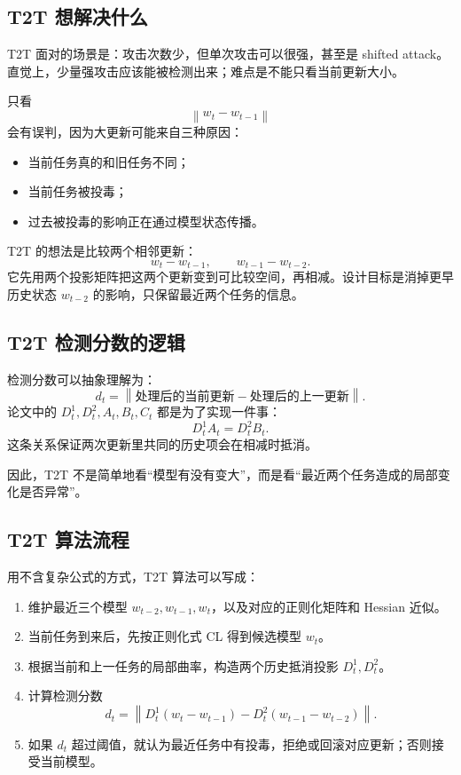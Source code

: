 \documentclass[UTF8,fontset=none,11pt]{ctexart}
\newcommand{\norm}[1]{\left\lVert #1\right\rVert}
\begin{document}
\subsection{T2T 想解决什么}

T2T 面对的场景是：攻击次数少，但单次攻击可以很强，甚至是 shifted attack。直觉上，少量强攻击应该能被检测出来；难点是不能只看当前更新大小。

只看
\[
  \norm{w_t-w_{t-1}}
\]
会有误判，因为大更新可能来自三种原因：
\begin{itemize}
  \item 当前任务真的和旧任务不同；
  \item 当前任务被投毒；
  \item 过去被投毒的影响正在通过模型状态传播。
\end{itemize}

T2T 的想法是比较两个相邻更新：
\[
  w_t-w_{t-1},
  \qquad
  w_{t-1}-w_{t-2}.
\]
它先用两个投影矩阵把这两个更新变到可比较空间，再相减。设计目标是消掉更早历史状态 \(w_{t-2}\) 的影响，只保留最近两个任务的信息。

\subsection{T2T 检测分数的逻辑}

检测分数可以抽象理解为：
\[
  d_t
  =
  \norm{
  \text{处理后的当前更新}
  -
  \text{处理后的上一更新}
  }.
\]
论文中的 \(D_t^1,D_t^2,A_t,B_t,C_t\) 都是为了实现一件事：
\[
  D_t^1A_t=D_t^2B_t.
\]
这条关系保证两次更新里共同的历史项会在相减时抵消。

因此，T2T 不是简单地看“模型有没有变大”，而是看“最近两个任务造成的局部变化是否异常”。

\subsection{T2T 算法流程}

用不含复杂公式的方式，T2T 算法可以写成：

\begin{enumerate}
  \item 维护最近三个模型 \(w_{t-2},w_{t-1},w_t\)，以及对应的正则化矩阵和 Hessian 近似。
  \item 当前任务到来后，先按正则化式 CL 得到候选模型 \(w_t\)。
  \item 根据当前和上一任务的局部曲率，构造两个历史抵消投影 \(D_t^1,D_t^2\)。
  \item 计算检测分数
  \[
    d_t=\norm{D_t^1(w_t-w_{t-1})-D_t^2(w_{t-1}-w_{t-2})}.
  \]
  \item 如果 \(d_t\) 超过阈值，就认为最近任务中有投毒，拒绝或回滚对应更新；否则接受当前模型。
\end{enumerate}
\end{document}
